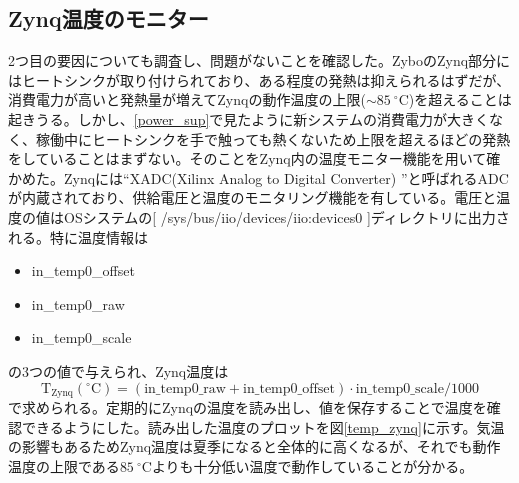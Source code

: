 \subsection{Zynq温度のモニター}
2つ目の要因についても調査し、問題がないことを確認した。ZyboのZynq部分にはヒートシンクが取り付けられており、ある程度の発熱は抑えられるはずだが、消費電力が高いと発熱量が増えてZynqの動作温度の上限($\sim\SI{85}{^{\circ}}$C)を超えることは起きうる。しかし、\ref{power_sup}で見たように新システムの消費電力が大きくなく、稼働中にヒートシンクを手で触っても熱くないため上限を超えるほどの発熱をしていることはまずない。そのことをZynq内の温度モニター機能を用いて確かめた。Zynqには``XADC(Xilinx Analog to Digital Converter) \cite{xadc}''と呼ばれるADCが内蔵されており、供給電圧と温度のモニタリング機能を有している。電圧と温度の値はOSシステムの[ /sys/bus/iio/devices/iio:devices0 ]ディレクトリに出力される。特に温度情報は
\begin{itemize}
  \item in\_temp0\_offset
  \item in\_temp0\_raw
  \item in\_temp0\_scale
\end{itemize}
の3つの値で与えられ、Zynq温度は
\begin{equation}
  \mathrm{T}_{\mathrm{Zynq}}(^{\circ}\mathrm{C}) = (\mathrm{in\_temp0\_raw} + \mathrm{in\_temp0\_offset})\cdot \mathrm{in\_temp0\_scale} / 1000
\end{equation}
で求められる。定期的にZynqの温度を読み出し、値を保存することで温度を確認できるようにした。読み出した温度のプロットを図\ref{temp_zynq}に示す。気温の影響もあるためZynq温度は夏季になると全体的に高くなるが、それでも動作温度の上限である$\SI{85}{^{\circ}}$Cよりも十分低い温度で動作していることが分かる。



